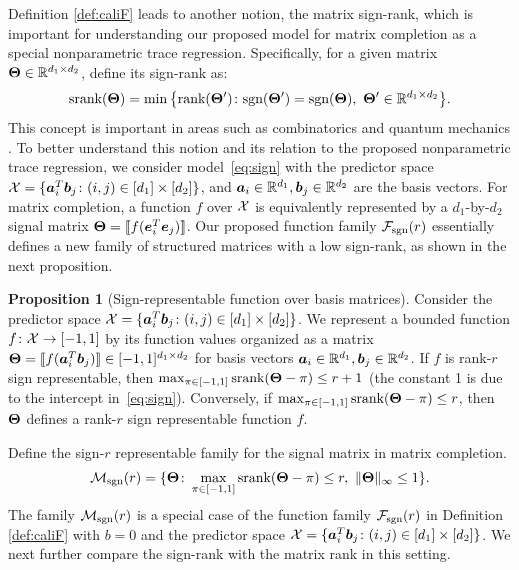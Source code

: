 \documentclass[aos]{imsart}
\theoremstyle{definition}
\newtheorem{proposition}{Proposition}
\def\sign{\textup{sgn}}
\def\srank{\textup{srank}}
\def\rank{\textup{rank}}
\def\caliF{\tF_{\textup{sgn}}}
\def\caliM{\tM_{\textup{sgn}}}
\begin{document}
Definition \ref{def:caliF} leads to another notion, the matrix sign-rank, which is important for understanding our proposed model for matrix completion as a special nonparametric trace regression. Specifically, for a given matrix $\bm{\Theta}\in\mathbb{R}^{d_1\times d_2}$, define its sign-rank as: 
\begin{equation*}
\srank(\mTheta)=\min\big\{ \rank(\mTheta')\colon \sign(\mTheta')=\sign(\mTheta),\  \mTheta'\in\mathbb{R}^{d_1\times d_2} \big\}.
\end{equation*}
This concept is important in areas such as combinatorics \citep{cohn2013fast} and quantum mechanics \citep{de2003nondeterministic}. To better understand this notion and its relation to the proposed nonparametric trace regression, we consider model~\eqref{eq:sign} with the predictor space $\mathcal{X} = \{\bm{a}^T_i\bm{b}_j\colon (i,j)\in[d_1]\times[d_2]\}$, and $\bm{a}_i\in\mathbb{R}^{d_1}, \bm{b}_j\in\mathbb{R}^{d_2}$ are the basis vectors. For matrix completion, a function $f$ over $\mathcal{X}$ is equivalently represented by a $d_1$-by-$d_2$ signal matrix $\bm{\Theta}=\llbracket f(\bm{e}^T_i\bm{e}_j) \rrbracket$. Our proposed function family $\caliF(r)$ essentially defines a new family of structured matrices with a low sign-rank, as shown in the next proposition. 

\begin{proposition}[Sign-representable function over basis matrices]\label{prop:signbasis} Consider the predictor space $\mathcal{X}=\{\bm{a}^T_i\bm{b}_j \colon (i,j)\in[d_1]\times[d_2]\}$. We represent a bounded function $f\colon \mathcal{X}\to [-1,1]$ by its function values organized as a matrix $\bm{\Theta}=\llbracket f(\bm{a}^T_i\bm{b}_j) \rrbracket \in [-1,1]^{d_1\times d_2}$ for basis vectors $\bm{a}_i\in\mathbb{R}^{d_1}, \bm{b}_j\in\mathbb{R}^{d_2}$. If $f$ is rank-$r$ sign representable, then $\max_{\pi\in[-1,1]}\srank(\mTheta-\pi)\leq r+1$ (the constant 1 is due to the intercept in~\eqref{eq:sign}). Conversely, if $\max_{\pi\in[-1,1]}\srank(\mTheta-\pi)\leq r$, then $\bm{\Theta}$ defines a rank-$r$ sign representable function $f$. 
\end{proposition}

Define the sign-$r$ representable family for the signal matrix in matrix completion.  
\begin{align*}
\caliM(r)=\{\mTheta\colon \max_{\pi\in[-1,1]}\srank(\mTheta-\pi)\leq r, \ \mnormSize{}{\mTheta}\leq 1\}.
\end{align*}
The family $\caliM(r)$ is a special case of the function family $\caliF(r)$ in Definition \ref{def:caliF} with $b=0$ and the predictor space $\mathcal{X}=\{\bm{a}_i^T\bm{b}_j\colon (i,j)\in[d_1]\times[d_2]\}$. We next further compare the sign-rank with the matrix rank in this setting. 
\end{document}
